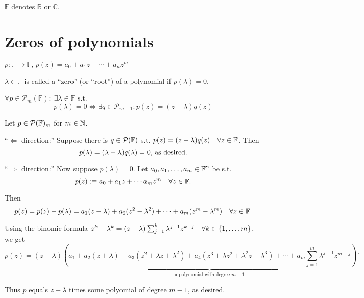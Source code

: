 
$\mathbb{F}$ denotes $\mathbb{R}$ or $\mathbb{C}$.

\section{Zeros of polynomials}
$p: \mathbb{F} \to \mathbb{F}, \, p(z) = a_0 + a_1z + \cdots + a_n z^m$

\setcounter{thm}{4}
\begin{mydef}
  $\lambda \in \mathbb{F}$ is called a ``zero''  (or ``root'') of a polynomial if $p(\lambda) = 0$.
\end{mydef}

\setcounter{thm}{5}
\begin{thm}
  \label{factororing-out-zeros-of-a-polynomial-always-possible}
  $\forall p \in \mathcal{P}_m(\mathbb{F}): \; \exists \lambda \in \mathbb{F}$ s.t.
  \begin{equation}
  	p(\lambda) = 0 \iff \exists q \in \mathcal{P}_{m-1}: p(z) = (z-\lambda)q(z)
  \end{equation}
\end{thm}
\begin{prf} Let $p\in \mathcal{P}(\mathbb{F})_m$ for $m\in \mathbb{N}$.
  
  ``$\Leftarrow$ direction:'' Suppose there is $q \in \mathcal{P}(\mathbb{F})$ s.t. $p(z) = (z-\lambda)q(z) \quad \forall z \in \mathbb{F}$. Then
  \begin{equation}
    p(\lambda) = (\lambda -\lambda)q(\lambda) = 0,$ as desired.$
  \end{equation}
  
  ``$\Rightarrow$ direction:'' Now suppose $p(\lambda)=0$. Let $a_0, a_1, \ldots, a_m \in \mathbb{F}"$ be s.t.
  \begin{equation}
    p(z) :\equiv a_0 + a_1z + \cdots a_mz^m \quad \forall z \in  \mathbb{F}.
  \end{equation}
  
  Then
  \begin{equation}
    \label{eq: second formula of pz: pz = pz - plambda}
    p(z) = p(z)- p(\lambda) = a_1 (z-\lambda) + a_2 (z^2 - \lambda^2) + \cdots+ a_m (z^m- \lambda^m) \quad \forall z \in \mathbb{F}.
  \end{equation}
  
  Using the binomic formula 
  $z^k - \lambda^k = (z-\lambda) \sum_{j=1}^{k} \lambda^{j-1}z^{k-j} \quad \forall k\in \{ 1, \ldots, m \}$, we get 
  \begin{equation}
    p(z) = (z-\lambda)
    \underbrace{
      \left(
        a_1 + a_2 (z+\lambda) + a_3(z^2 + \lambda z + \lambda^2) +
        a_4 (z^3 + \lambda z^2 + \lambda^2 z + \lambda^3) 
        + \cdots +
        a_m \sum_{j=1}^{m} \lambda^{j-1} z^{m-j}
      \right)}_{\text{a polynomial with degree $m-1$}}´
  \end{equation}
  
  Thus $p$ equals $z-\lambda$ times some polyomial of degree $m-1$, as desired.
\end{prf}

